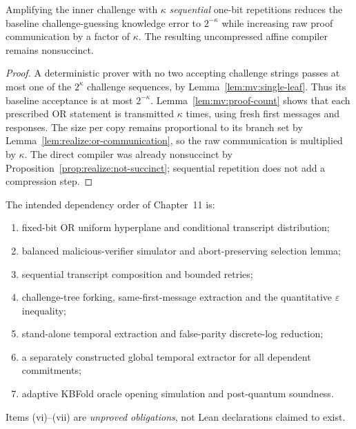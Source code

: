 \begin{proposition}\label{prop:mv:tradeoff}
Amplifying the inner challenge
with $\kappa$ \emph{sequential}
one-bit repetitions reduces the
baseline challenge-guessing
knowledge error to $2^{-\kappa}$
while increasing raw proof
communication by a factor of
$\kappa$. The resulting
uncompressed affine compiler
remains nonsuccinct.
\end{proposition}
\begin{proof}
A deterministic prover with no
two accepting challenge strings
passes at most one of the
$2^\kappa$ challenge sequences,
by Lemma~\ref{lem:mv:single-leaf}.
Thus its baseline acceptance is
at most $2^{-\kappa}$.
Lemma~\ref{lem:mv:proof-count}
shows that each prescribed OR
statement is transmitted
$\kappa$ times, using fresh
first messages and responses.
The size per copy remains
proportional to its branch set
by Lemma~\ref{lem:realize:or-communication},
so the raw communication is
multiplied by $\kappa$.
The direct compiler was already
nonsuccinct by
Proposition~\ref{prop:realize:not-succinct};
sequential repetition does not
add a compression step.
\end{proof}

\begin{definition}\label{def:mv:lean-graph}
The intended dependency order
of Chapter~11 is:
\begin{enumerate}[label=\textup{(\roman*)}]
\item fixed-bit OR uniform
hyperplane and conditional
transcript distribution;
\item balanced malicious-verifier
simulator and abort-preserving
selection lemma;
\item sequential transcript
composition and bounded retries;
\item challenge-tree forking,
same-first-message extraction
and the quantitative $\varepsilon$
inequality;
\item stand-alone temporal
extraction and false-parity
discrete-log reduction;
\item a separately constructed
global temporal extractor for
all dependent commitments;
\item adaptive KBFold oracle
opening simulation and
post-quantum soundness.
\end{enumerate}
Items (vi)--(vii) are
\emph{unproved obligations},
not Lean declarations claimed
to exist.
\end{definition}

